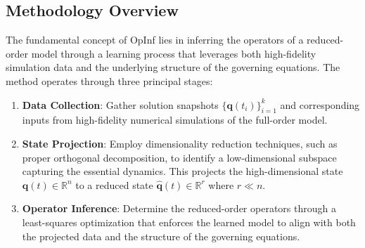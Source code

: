 \subsection*{Methodology Overview}
The fundamental concept of OpInf lies in inferring the operators of a reduced-order model through a learning process that leverages both high-fidelity simulation data and the underlying structure of the governing equations. The method operates through three principal stages:

\begin{enumerate}
    \item \textbf{Data Collection}: Gather solution snapshots $\{ \mathbf{q}(t_i) \}_{i=1}^{k}$ and corresponding inputs from high-fidelity numerical simulations of the full-order model.
    
    \item \textbf{State Projection}: Employ dimensionality reduction techniques, such as proper orthogonal decomposition, to identify a low-dimensional subspace capturing the essential dynamics. This projects the high-dimensional state $\mathbf{q}(t) \in \mathbb{R}^n$ to a reduced state $\hat{\mathbf{q}}(t) \in \mathbb{R}^r$ where $r \ll n$.
    
    \item \textbf{Operator Inference}: Determine the reduced-order operators through a least-squares optimization that enforces the learned model to align with both the projected data and the structure of the governing equations.
\end{enumerate}

